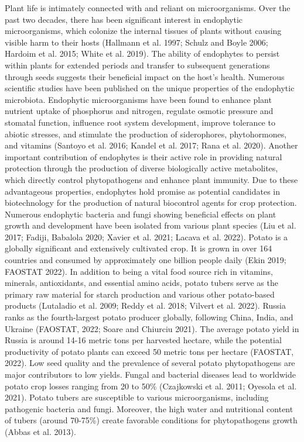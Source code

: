 \documentclass[sn-mathphys,Numbered]{sn-jnl}%
\theoremstyle{thmstyleone}%
\theoremstyle{thmstyletwo}%
\theoremstyle{thmstylethree}%
\begin{document}
Plant life is intimately connected with and reliant on microorganisms. Over the past two decades, there has been significant interest in endophytic microorganisms, which colonize the internal tissues of plants without causing visible harm to their hosts (Hallmann et al.  1997; Schulz and Boyle 2006; Hardoim et al.  2015; White et al.  2019). The ability of endophytes to persist within plants for extended periods and transfer to subsequent generations through seeds suggests their beneficial impact on the host's health. Numerous scientific studies have been published on the unique properties of the endophytic microbiota. Endophytic microorganisms have been found to enhance plant nutrient uptake of phosphorus and nitrogen, regulate osmotic pressure and stomatal function, influence root system development, improve tolerance to abiotic stresses, and stimulate the production of siderophores, phytohormones, and vitamins (Santoyo et al. 2016; Kandel et al. 2017; Rana et al. 2020). Another important contribution of endophytes is their active role in providing natural protection through the production of diverse biologically active metabolites, which directly control phytopathogens and enhance plant immunity. Due to these advantageous properties, endophytes hold promise as potential candidates in biotechnology for the production of natural biocontrol agents for crop protection. Numerous endophytic bacteria and fungi showing beneficial effects on plant growth and development have been isolated from various plant species (Liu et al. 2017; Fadiji, Babalola 2020; Xavier et al. 2021; Lacava et al. 2022).
Potato is a globally significant and extensively cultivated crop. It is grown in over 164 countries and consumed by approximately one billion people daily (Ekin 2019; FAOSTAT 2022). In addition to being a vital food source rich in vitamins, minerals, antioxidants, and essential amino acids, potato tubers serve as the primary raw material for starch production and various other potato-based products (Lutaladio et al. 2009; Reddy et al. 2018; Vilvert et al. 2022).
Russia ranks as the fourth-largest potato producer globally, following China, India, and Ukraine (FAOSTAT, 2022; Soare and Chiurciu 2021). The average potato yield in Russia is around 14-16 metric tons per harvested hectare, while the potential productivity of potato plants can exceed 50 metric tons per hectare (FAOSTAT, 2022). Low seed quality and the prevalence of several potato phytopathogens are major contributors to low yields. Fungal and bacterial diseases lead to worldwide potato crop losses ranging from 20 to 50\% (Czajkowski et al. 2011; Oyesola et al. 2021). Potato tubers are susceptible to various microorganisms, including pathogenic bacteria and fungi. Moreover, the high water and nutritional content of tubers (around 70-75\%) create favorable conditions for phytopathogens growth (Abbas et al. 2013).
\end{document}
